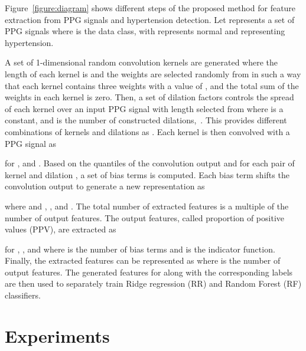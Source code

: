 \documentclass[letterpaper, 10 pt, conference]{ieeeconf}
\begin{document}
Figure~\ref{figure:diagram} shows different steps of the proposed method for feature extraction from PPG signals and hypertension detection. Let  represents a set of  PPG signals where  is the data class, with  represents normal and  representing hypertension. 


A set of  1-dimensional random convolution kernels  are generated where the length of each kernel is  and the weights are selected randomly from  in such a way that each kernel contains three weights with a value of , and the total sum of the weights in each kernel is zero. Then, a set of dilation factors controls the spread of each kernel over an input PPG signal with length  selected from  where  is a constant,  and  is the number of constructed dilations,~\cite{dempster2021MiniROCKET,salehinejad2023joint}. 
This provides  different combinations of kernels and dilations as . 
Each kernel is then convolved with a PPG signal  as

for , and . 
Based on the quantiles of the convolution output and for each pair of kernel and dilation , a set of bias terms  is computed. Each bias term shifts the convolution output to generate a new representation as  

where  and , , and . The total number of extracted features is a multiple of the number of output features. The output features, called proportion of positive values (PPV), are extracted as

for , , and  where  is the number of bias terms and  is the indicator function. Finally, the extracted features can be represented as  where  is the number of output features. The generated features  for  along with the corresponding labels are then used to separately train Ridge regression (RR) and Random Forest (RF) classifiers.

































\section{Experiments}
\end{document}
